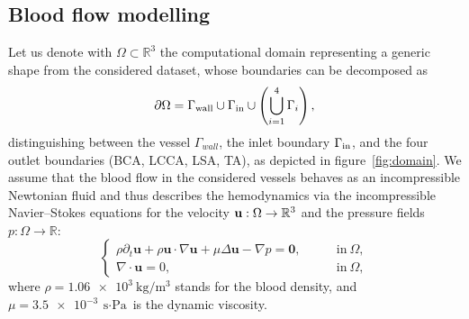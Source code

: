\subsection{Blood flow modelling}\label{ssec:blood_flow}
Let us denote with $\Omega \subset \mathbb R^3$ the computational domain representing a generic shape from the considered dataset, whose boundaries can be decomposed as
\begin{equation}\label{eq:omega_bnd}
\partial \Omega = \Gamma_{\text{wall}} \cup \Gamma_{\rm in} \cup \left( \bigcup_{i=1}^4 \Gamma_i \right),
\end{equation}
distinguishing between the vessel  $\Gamma_{wall}$, the inlet boundary $\Gamma_{\rm in}$, and the four outlet boundaries (BCA, LCCA, LSA, TA), as depicted in figure \ref{fig:domain}. We assume that the blood flow in the considered vessels behaves as an incompressible Newtonian fluid and thus describes the hemodynamics via the incompressible Navier--Stokes equations for the velocity $\mathbf{u}:\Omega \to \mathbb R^3$ and the pressure fields $p:\Omega \to \mathbb R$:
\begin{equation}\label{eq:3dnse}
\left\{
\begin{aligned}
\rho \partial_t \mathbf{u}+\rho \mathbf{u}\cdot\nabla\mathbf{u}+\mu\Delta\mathbf{u}-\nabla p=\mathbf{0},\qquad&\text{in}\ \Omega,\\
    \nabla\cdot\mathbf{u}=0,\qquad&\text{in}\ \Omega,
\end{aligned}
\right.
\end{equation}
%
where $\rho=\SI{1.06e3}{\kilogram\per\meter^3}$ stands for the blood density, and $\mu=\SI{3.5e-3}{\second\cdot\pascal}$ is the dynamic viscosity. 



